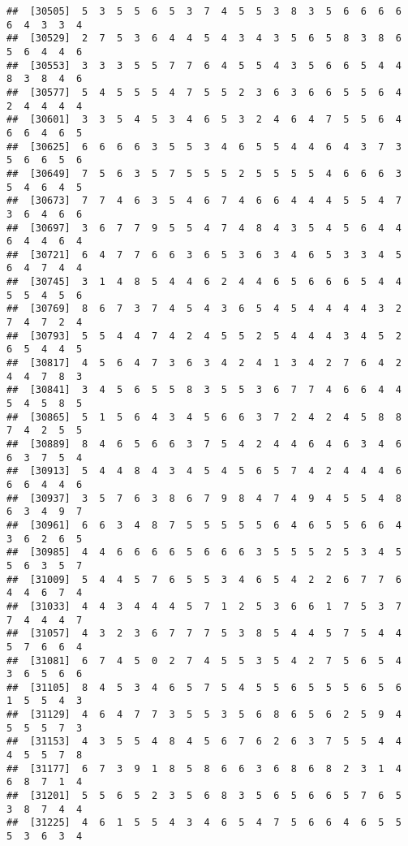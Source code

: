 \documentclass[
]{book}
\begin{document}
\begin{verbatim}
##  [30505]  5  3  5  5  6  5  3  7  4  5  5  3  8  3  5  6  6  6  6  6  4  3  3  4
##  [30529]  2  7  5  3  6  4  4  5  4  3  4  3  5  6  5  8  3  8  6  5  6  4  4  6
##  [30553]  3  3  3  5  5  7  7  6  4  5  5  4  3  5  6  6  5  4  4  8  3  8  4  6
##  [30577]  5  4  5  5  5  4  7  5  5  2  3  6  3  6  6  5  5  6  4  2  4  4  4  4
##  [30601]  3  3  5  4  5  3  4  6  5  3  2  4  6  4  7  5  5  6  4  6  6  4  6  5
##  [30625]  6  6  6  6  3  5  5  3  4  6  5  5  4  4  6  4  3  7  3  5  6  6  5  6
##  [30649]  7  5  6  3  5  7  5  5  5  2  5  5  5  5  4  6  6  6  3  5  4  6  4  5
##  [30673]  7  7  4  6  3  5  4  6  7  4  6  6  4  4  4  5  5  4  7  3  6  4  6  6
##  [30697]  3  6  7  7  9  5  5  4  7  4  8  4  3  5  4  5  6  4  4  6  4  4  6  4
##  [30721]  6  4  7  7  6  6  3  6  5  3  6  3  4  6  5  3  3  4  5  6  4  7  4  4
##  [30745]  3  1  4  8  5  4  4  6  2  4  4  6  5  6  6  6  5  4  4  5  5  4  5  6
##  [30769]  8  6  7  3  7  4  5  4  3  6  5  4  5  4  4  4  4  3  2  7  4  7  2  4
##  [30793]  5  5  4  4  7  4  2  4  5  5  2  5  4  4  4  3  4  5  2  6  5  4  4  5
##  [30817]  4  5  6  4  7  3  6  3  4  2  4  1  3  4  2  7  6  4  2  4  4  7  8  3
##  [30841]  3  4  5  6  5  5  8  3  5  5  3  6  7  7  4  6  6  4  4  5  4  5  8  5
##  [30865]  5  1  5  6  4  3  4  5  6  6  3  7  2  4  2  4  5  8  8  7  4  2  5  5
##  [30889]  8  4  6  5  6  6  3  7  5  4  2  4  4  6  4  6  3  4  6  6  3  7  5  4
##  [30913]  5  4  4  8  4  3  4  5  4  5  6  5  7  4  2  4  4  4  6  6  6  4  4  6
##  [30937]  3  5  7  6  3  8  6  7  9  8  4  7  4  9  4  5  5  4  8  6  3  4  9  7
##  [30961]  6  6  3  4  8  7  5  5  5  5  5  6  4  6  5  5  6  6  4  3  6  2  6  5
##  [30985]  4  4  6  6  6  6  5  6  6  6  3  5  5  5  2  5  3  4  5  5  6  3  5  7
##  [31009]  5  4  4  5  7  6  5  5  3  4  6  5  4  2  2  6  7  7  6  4  4  6  7  4
##  [31033]  4  4  3  4  4  4  5  7  1  2  5  3  6  6  1  7  5  3  7  7  4  4  4  7
##  [31057]  4  3  2  3  6  7  7  7  5  3  8  5  4  4  5  7  5  4  4  5  7  6  6  4
##  [31081]  6  7  4  5  0  2  7  4  5  5  3  5  4  2  7  5  6  5  4  3  6  5  6  6
##  [31105]  8  4  5  3  4  6  5  7  5  4  5  5  6  5  5  5  6  5  6  1  5  5  4  3
##  [31129]  4  6  4  7  7  3  5  5  3  5  6  8  6  5  6  2  5  9  4  5  5  5  7  3
##  [31153]  4  3  5  5  4  8  4  5  6  7  6  2  6  3  7  5  5  4  4  4  5  5  7  8
##  [31177]  6  7  3  9  1  8  5  8  6  6  3  6  8  6  8  2  3  1  4  6  8  7  1  4
##  [31201]  5  5  6  5  2  3  5  6  8  3  5  6  5  6  6  5  7  6  5  3  8  7  4  4
##  [31225]  4  6  1  5  5  4  3  4  6  5  4  7  5  6  6  4  6  5  5  5  3  6  3  4

\end{verbatim}
\end{document}

